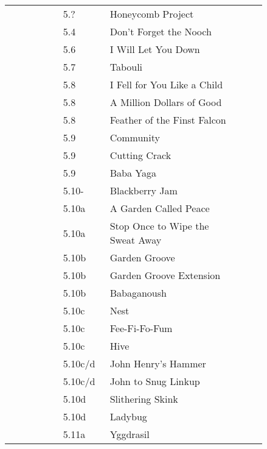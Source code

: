 \begin{flushleft}
\begin{center}
\begin{supertabular}{p{0.18\linewidth}p{0.13\linewidth}p{0.45\linewidth}p{0.08\linewidth}}
&5.?&Honeycomb Project & \pageref{rt:Honeycomb Project} \\
&5.4&Don't Forget the Nooch & \pageref{rt:Don't Forget the Nooch} \\
&5.6&I Will Let You Down & \pageref{rt:I Will Let You Down} \\
&5.7&Tabouli & \pageref{rt:Tabouli} \\
&5.8&I Fell for You Like a Child & \pageref{rt:I Fell for You Like a Child} \\
&5.8&A Million Dollars of Good & \pageref{rt:A Million Dollars of Good} \\
&5.8&Feather of the Finst Falcon & \pageref{rt:Feather of the Finst Falcon} \\
&5.9&Community & \pageref{rt:Community} \\
&5.9&Cutting Crack & \pageref{rt:Cutting Crack} \\
&5.9&Baba Yaga & \pageref{rt:Baba Yaga} \\
&5.10-&Blackberry Jam & \pageref{rt:Blackberry Jam} \\
&5.10a&A Garden Called Peace & \pageref{rt:A Garden Called Peace} \\
&5.10a&Stop Once to Wipe the Sweat Away & \pageref{rt:Stop Once to Wipe the Sweat Away} \\
&5.10b&Garden Groove & \pageref{rt:Garden Groove} \\
&5.10b&Garden Groove Extension & \pageref{vr:Garden Groove Extension} \\
&5.10b&Babaganoush & \pageref{rt:Babaganoush} \\
&5.10c&Nest & \pageref{rt:Nest} \\
&5.10c&Fee-Fi-Fo-Fum & \pageref{rt:Fee-Fi-Fo-Fum} \\
&5.10c&Hive & \pageref{rt:Hive} \\
&5.10c/d&John Henry's Hammer & \pageref{rt:John Henry's Hammer} \\
&5.10c/d&John to Snug Linkup & \pageref{vr:John to Snug Linkup} \\
&5.10d&Slithering Skink & \pageref{rt:Slithering Skink} \\
&5.10d&Ladybug & \pageref{rt:Ladybug} \\
&5.11a&Yggdrasil & \pageref{rt:Yggdrasil} \\

\end{supertabular}
\end{center}
\end{flushleft}
